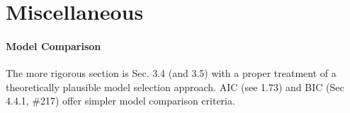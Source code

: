 \documentclass[a4paper]{article}
\begin{document}
\clearpage
\newpage



\section*{Miscellaneous}
\paragraph*{Model Comparison} The more rigorous section is Sec. 3.4 (and 3.5) with a proper treatment of a theoretically plausible model selection approach. AIC (see 1.73) and BIC (Sec 4.4.1, \#217) offer simpler model comparison criteria.







\end{document}
